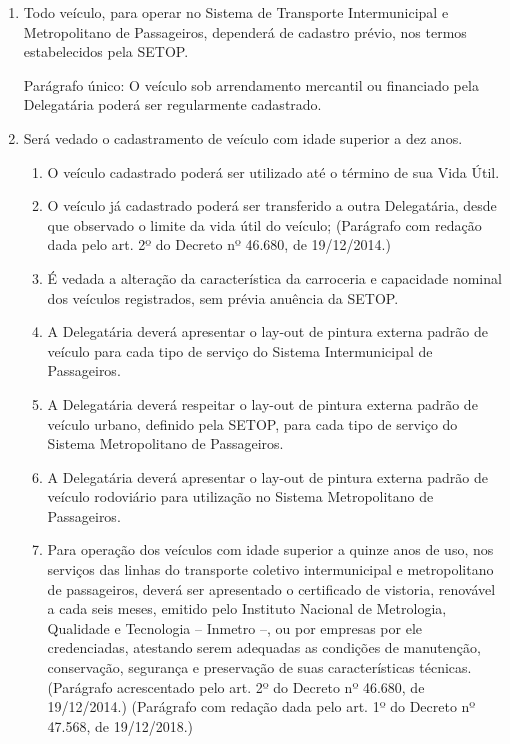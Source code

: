 \begin{enumerate}[resume, label=Art. \arabic*]

\item Todo veículo, para operar no Sistema de Transporte Intermunicipal e Metropolitano de Passageiros, dependerá de cadastro prévio, nos termos estabelecidos pela SETOP.

Parágrafo único: O veículo sob arrendamento mercantil ou financiado pela Delegatária poderá ser regularmente cadastrado.

\item Será vedado o cadastramento de veículo com idade superior a dez anos.

\begin{enumerate}[label= \S \arabic*] %

\item O veículo cadastrado poderá ser utilizado até o término de sua Vida Útil.

\item O veículo já cadastrado poderá ser transferido a outra Delegatária, desde que observado o limite da vida útil do veículo; (Parágrafo com redação dada pelo art. 2º do Decreto nº 46.680, de 19/12/2014.)

\item É vedada a alteração da característica da carroceria e capacidade nominal dos veículos registrados, sem prévia anuência da SETOP.

\item A Delegatária deverá apresentar o lay-out de pintura externa padrão de veículo para cada tipo de serviço do Sistema Intermunicipal de Passageiros.

\item A Delegatária deverá respeitar o lay-out de pintura externa padrão de veículo urbano, definido pela SETOP, para cada tipo de serviço do Sistema Metropolitano de Passageiros.

\item A Delegatária deverá apresentar o lay-out de pintura externa padrão de veículo rodoviário para utilização no Sistema Metropolitano de Passageiros.

\item Para operação dos veículos com idade superior a quinze anos de uso, nos serviços das linhas do transporte coletivo intermunicipal e metropolitano de passageiros, deverá ser apresentado o certificado de vistoria, renovável a cada seis meses, emitido pelo Instituto Nacional de Metrologia, Qualidade e Tecnologia – Inmetro –, ou por empresas por ele credenciadas, atestando serem adequadas as condições de manutenção, conservação, segurança e preservação de suas características técnicas. (Parágrafo acrescentado pelo art. 2º do Decreto nº 46.680, de 19/12/2014.) (Parágrafo com redação dada pelo art. 1º do Decreto nº 47.568, de 19/12/2018.)


\end{enumerate}
\end{enumerate}
